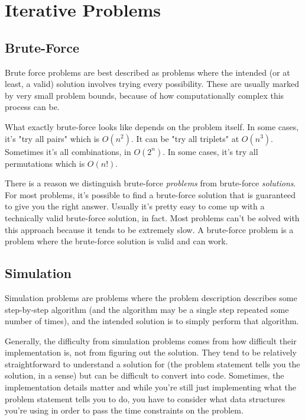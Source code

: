 \section{Iterative Problems}

\subsection{Brute-Force}

Brute force problems are best described as problems where the intended (or at least, a valid) solution involves trying every possibility. These are usually marked by very small problem bounds, because of how computationally complex this process can be.

What exactly brute-force looks like depends on the problem itself. In some cases, it's "try all pairs" which is $O(n^2)$. It can be "try all triplets" at $O(n^3)$. Sometimes it's all combinations, in $O(2^n)$. In some cases, it's try all permutations which is $O(n!)$.

There is a reason we distinguish brute-force \textit{problems} from brute-force \textit{solutions}. For most problems, it's possible to find a brute-force solution that is guaranteed to give you the right answer. Usually it's pretty easy to come up with a technically valid brute-force solution, in fact. Most problems can't be solved with this approach because it tends to be extremely slow. A brute-force problem is a problem where the brute-force solution is valid and can work.

\subsection{Simulation}

Simulation problems are problems where the problem description describes some step-by-step algorithm (and the algorithm may be a single step repeated some number of times), and the intended solution is to simply perform that algorithm.

Generally, the difficulty from simulation problems comes from how difficult their implementation is, not from figuring out the solution. They tend to be relatively straightforward to understand a solution for (the problem statement tells you the solution, in a sense) but can be difficult to convert into code. Sometimes, the implementation details matter and while you're still just implementing what the problem statement tells you to do, you have to consider what data structures you're using in order to pass the time constraints on the problem.

